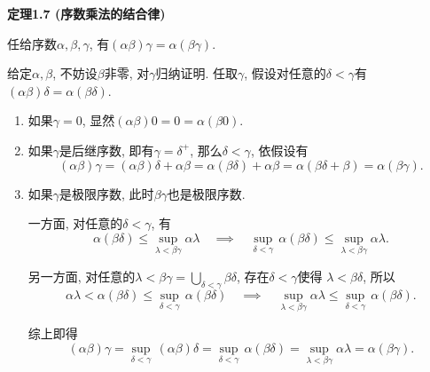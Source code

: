 \documentclass[UTF8]{ctexart}
\begin{document}
\hypertarget{sec:定理1.7}{}
\noindent\textbf{定理1.7 (序数乘法的结合律)}

任给序数$\alpha,\beta,\gamma$, 有$(\alpha\beta)\gamma=\alpha(\beta\gamma)$.


给定$\alpha,\beta$, 不妨设$\beta$非零, 对$\gamma$归纳证明.
任取$\gamma$, 假设对任意的$\delta<\gamma$有
$(\alpha\beta)\delta=\alpha(\beta\delta)$.

\begin{enumerate}
    \item 如果$\gamma=0$, 显然$(\alpha\beta)0=0=\alpha(\beta0)$.
    
    \vspace{3pt}
    \item 如果$\gamma$是后继序数, 即有$\gamma=\delta^+$, 那么$\delta<\gamma$,
    依假设有
    \[
        (\alpha\beta)\gamma=(\alpha\beta)\delta+\alpha\beta=
        \alpha(\beta\delta)+\alpha\beta=\alpha(\beta\delta+\beta)=
        \alpha(\beta\gamma).
    \]

    \vspace{3pt}
    \item 如果$\gamma$是极限序数, 此时$\beta\gamma$也是极限序数.
    
    \vspace{3pt}\hspace{2.17em}
    一方面, 对任意的$\delta<\gamma$, 有
    \vspace{3pt}
    \[
        \alpha(\beta\delta)\leqslant\sup_{\lambda<\beta\gamma}\alpha\lambda
        \quad\implies\quad\sup_{\delta<\gamma}\,\alpha(\beta\delta)
        \leqslant\sup_{\lambda<\beta\gamma}\alpha\lambda.
    \]
    
    \vspace{3pt}\hspace{2.17em}
    另一方面, 对任意的$\displaystyle\lambda<\beta\gamma=
    \bigcup_{\delta<\gamma}\beta\delta$, 存在$\delta<\gamma$使得
    $\lambda<\beta\delta$, 所以
    \vspace{3pt}
    \[
        \alpha\lambda<\alpha(\beta\delta)
        \leqslant\sup_{\delta<\gamma}\,\alpha(\beta\delta)
        \quad\implies\quad\sup_{\lambda<\beta\gamma}\alpha\lambda
        \leqslant\sup_{\delta<\gamma}\,\alpha(\beta\delta).
    \]

    \hspace{2.17em}
    综上即得
    \begin{equation*}
        (\alpha\beta)\gamma=\sup_{\delta<\gamma}\,(\alpha\beta)\delta=
        \sup_{\delta<\gamma}\,\alpha(\beta\delta)=
        \sup_{\lambda<\beta\gamma}\alpha\lambda=\alpha(\beta\gamma).
    \tag*{\qedsymbol}\end{equation*}
\end{enumerate}
\end{document}
